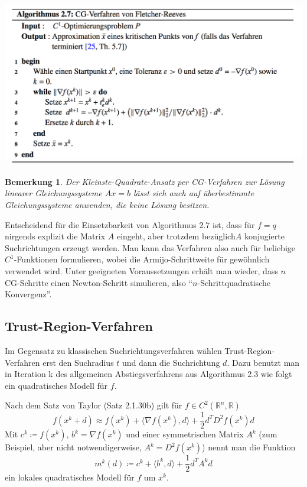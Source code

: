\documentclass[11pt]{scrreprt}
\newcounter{thm}
\theoremstyle{thmstyle}
\numberwithin{thm}{section}
\newtheorem{bemerkung}[thm]{Bemerkung}
\begin{document}
\begin{center}
	\includegraphics[scale=0.5]{a27}
\end{center}

\begin{bemerkung}
	Der Kleinste-Quadrate-Ansatz per CG-Verfahren zur Lösung linearer Gleichungssysteme $Ax = b$ lässt sich auch auf überbestimmte Gleichungssysteme anwenden, die keine Lösung besitzen.	
\end{bemerkung}

Entscheidend für die Einsetzbarkeit von Algorithmus 2.7 ist, dass für $f = q$ nirgends explizit die Matrix $A$ eingeht, aber trotzdem bezüglich$A$ konjugierte Suchrichtungen erzeugt werden. Man kann das Verfahren also auch für beliebige $C^1$-Funktionen formulieren, wobei die Armijo-Schrittweite für gewöhnlich verwendet wird. Unter geeigneten Voraussetzungen erhält man wieder, dass $n$ CG-Schritte einen Newton-Schritt simulieren, also \enquote{$n$-Schrittquadratische Konvergenz}. 

\subsection*{Trust-Region-Verfahren}

Im Gegensatz zu klassischen Suchrichtungsverfahren wählen Trust-Region-Verfahren erst den Suchradius $t$ und dann die Suchrichtung $d$. Dazu benutzt man in Iteration k des allgemeinen Abstiegsverfahrens aus Algorithmus 2.3 wie folgt ein quadratisches Modell für $f$. ~\bigskip

Nach dem Satz von Taylor (Satz 2.1.30b) gilt für $f \in C^2(\mathbb{R}^n, \mathbb{R})$
$$ f(x^k + d) \approx f(x^k) + \langle \nabla f(x^k) , d \rangle + \frac{1}{2} d^T D^2 f(x^k) d $$
Mit $c^k \coloneqq f(x^k)$, $b^k = \nabla f(x^k)$ und einer symmetrischen Matrix $A^k$ (zum Beispiel, aber nicht notwendigerweise, $A^k = D^2 f(x^k)$) nennt man die Funktion
$$ m^k(d) \coloneqq c^k + \langle b^k, d \rangle + \frac{1}{2} d^T A^k d $$
ein lokales quadratisches Modell für $f$ um $x^k$.  ~\bigskip
\end{document}
